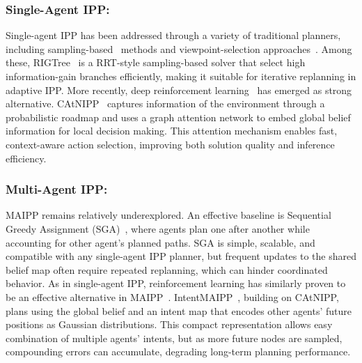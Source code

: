 \documentclass[runningheads]{llncs}
\begin{document}
\subsubsection{Single-Agent IPP:}
Single-agent IPP has been addressed through a variety of traditional planners, including sampling-based~\cite{hitz_adaptive_2017,Hollinger_2014_ippsample} methods and viewpoint-selection approaches~\cite{binney2012branchboundipp,meliou2007nonmyopic}. Among these, RIGTree~\cite{Hollinger_2014_ippsample} is a RRT-style sampling-based solver that select high information-gain branches efficiently, making it suitable for iterative replanning in adaptive IPP.
More recently, deep reinforcement learning~\cite{popovic2024learning,tan2025searchtta,wei2020ipprl} has emerged as strong alternative. CAtNIPP~\cite{cao2023catnipp} captures information of the environment through a probabilistic roadmap and uses a graph attention network to embed global belief information for local decision making. This attention mechanism enables fast, context-aware action selection, improving both solution quality and inference efficiency.

\subsubsection{Multi-Agent IPP:}
MAIPP remains relatively underexplored. An effective baseline is Sequential Greedy Assignment (SGA)~\cite{corah2017efficient}, where agents plan one after another while accounting for other agent's planned paths. SGA is simple, scalable, and compatible with any single-agent IPP planner, but frequent updates to the shared belief map often require repeated replanning, which can hinder coordinated behavior.
As in single-agent IPP, reinforcement learning has similarly proven to be an effective alternative in MAIPP~\cite{vashisth2025scalablemultirobotinformativepath,popo_ma,maipprl1}.
IntentMAIPP~\cite{yang2023intentmaipp}, building on CAtNIPP, plans using the global belief and an intent map that encodes other agents’ future positions as Gaussian distributions. This compact representation allows easy combination of multiple agents’ intents, but as more future nodes are sampled, compounding errors can accumulate, degrading long-term planning performance.
\end{document}
